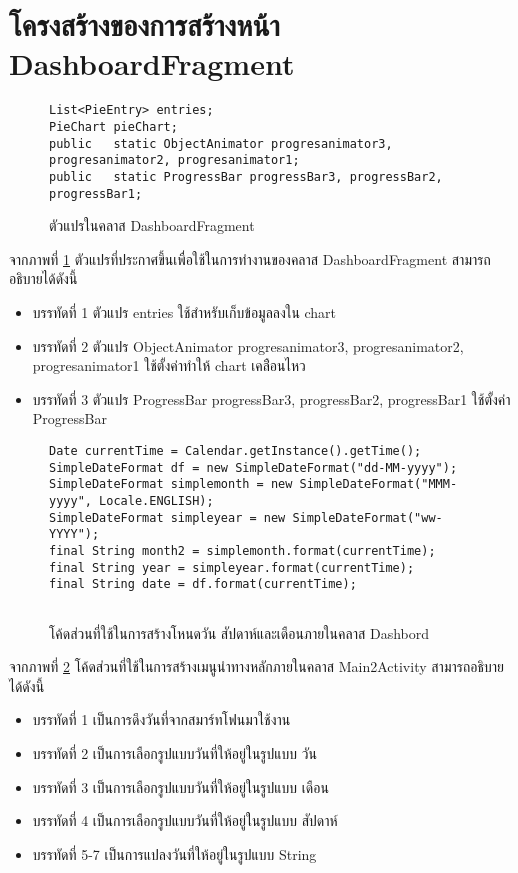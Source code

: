 	\section{โครงสร้างของการสร้างหน้า DashboardFragment}
	\begin{figure}[H]
		{\begin{lstlisting}
List<PieEntry> entries;
PieChart pieChart;
public   static ObjectAnimator progresanimator3, progresanimator2, progresanimator1;
public   static ProgressBar progressBar3, progressBar2, progressBar1;
	\end{lstlisting}}
		\caption{ตัวแปรในคลาส DashboardFragment}
		\label{Fig:DashboardFragment}
	\end{figure}
	จากภาพที่ \ref{Fig:DashboardFragment} ตัวแปรที่ประกาศขึ้นเพื่อใช้ในการทำงานของคลาส DashboardFragment สามารถอธิบายได้ดังนี้
	\begin{itemize}[label={--}]
		\item บรรทัดที่ 1 ตัวแปร entries ใช้สำหรับเก็บข้อมูลลงใน chart
		\item บรรทัดที่ 2 ตัวแปร ObjectAnimator progresanimator3, progresanimator2, progresanimator1 ใช้ตั้งค่าทำให้ chart เคล่ือนไหว
		\item บรรทัดที่ 3 ตัวแปร ProgressBar progressBar3, progressBar2, progressBar1 ใช้ตั้งค่า ProgressBar
	\end{itemize}
	\begin{figure}[H]
		{\begin{lstlisting}
Date currentTime = Calendar.getInstance().getTime();
SimpleDateFormat df = new SimpleDateFormat("dd-MM-yyyy");
SimpleDateFormat simplemonth = new SimpleDateFormat("MMM-yyyy", Locale.ENGLISH);
SimpleDateFormat simpleyear = new SimpleDateFormat("ww-YYYY");
final String month2 = simplemonth.format(currentTime);
final String year = simpleyear.format(currentTime);
final String date = df.format(currentTime);
	
			\end{lstlisting}}
		\caption{โค้ดส่วนที่ใช้ในการสร้างโหนดวัน สัปดาห์และเดือนภายในคลาส Dashbord}
		\label{Fig:Dashbord}
	\end{figure}
	จากภาพที่ \ref{Fig:Dashbord} โค้ดส่วนที่ใช้ในการสร้างเมนูนำทางหลักภายในคลาส Main2Activity สามารถอธิบายได้ดังนี้
	\begin{itemize}[label={--}]
		\item บรรทัดที่ 1  เป็นการดึงวันที่จากสมาร์ทโฟนมาใช้งาน
		\item บรรทัดที่ 2  เป็นการเลือกรูปแบบวันที่ให้อยู่ในรูปแบบ วัน
		\item บรรทัดที่ 3  เป็นการเลือกรูปแบบวันที่ให้อยู่ในรูปแบบ เดือน
		\item บรรทัดที่ 4  เป็นการเลือกรูปแบบวันที่ให้อยู่ในรูปแบบ สัปดาห์
		\item บรรทัดที่ 5-7 เป็นการแปลงวันที่ให้อยู่ในรูปแบบ String
	\end{itemize}
